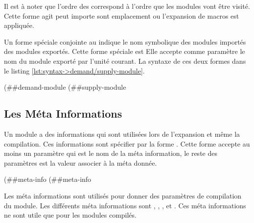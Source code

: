 Il est à noter que l'ordre des  correspond à l'ordre
que les modules vont être visité. Cette forme agit peut importe sont emplacement
ou l'expansion de macros est appliquée.



Un forme spéciale conjointe au  indique le nom
symbolique des modules importés des modules exportés. Cette forme spéciale est
 Elle accepte comme paramètre le nom du module exporté
par l'unité courant.  La syntaxe de ces deux formes dans le listing
\ref{lst:syntax->demand/supply-module}.\\
\begin{center}
  \begin{mplisting}{0.8}
(##demand-module %
(##supply-module %
\end{mplisting}
\end{center}

\subsection{Les Méta Informations}
Un module a des informations qui sont utilisées lors de l'expansion
et même la compilation. Ces informations sont spécifier par la forme
. Cette forme accepte au moins un paramètre qui
est le nom de la méta information, le reste des paramètres est la valeur
associer à la méta donnée.

\begin{center}
  \begin{mplisting}{0.5}
(##meta-info %
(##meta-info %
\end{mplisting}
\end{center}

Les méta informations sont utilisés pour donner des paramètres de compilation
du module. Les différents méta informations sont ,
, , 
et . Ces méta informations ne sont utile que pour les modules
compilés.

